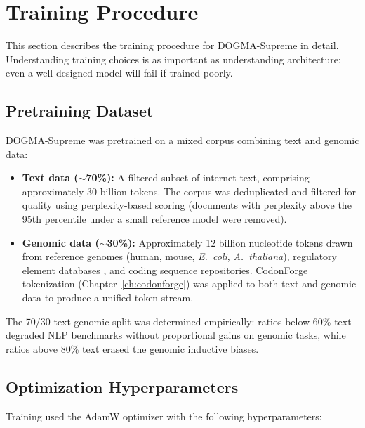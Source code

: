 \section{Training Procedure}
\label{sec:training}

This section describes the training procedure for DOGMA-Supreme in detail. Understanding training choices is as important as understanding architecture: even a well-designed model will fail if trained poorly.

\subsection{Pretraining Dataset}

DOGMA-Supreme was pretrained on a mixed corpus combining text and genomic data:

\begin{itemize}[leftmargin=1.8em]
  \item \textbf{Text data ($\sim$70\%):} A filtered subset of internet text, comprising approximately 30 billion tokens. The corpus was deduplicated and filtered for quality using perplexity-based scoring (documents with perplexity above the 95th percentile under a small reference model were removed).
  \item \textbf{Genomic data ($\sim$30\%):} Approximately 12 billion nucleotide tokens drawn from reference genomes (human, mouse, \textit{E.~coli}, \textit{A.~thaliana}), regulatory element databases \citep{encode2012}, and coding sequence repositories. CodonForge tokenization (Chapter~\ref{ch:codonforge}) was applied to both text and genomic data to produce a unified token stream.
\end{itemize}

The 70/30 text-genomic split was determined empirically: ratios below 60\% text degraded NLP benchmarks without proportional gains on genomic tasks, while ratios above 80\% text erased the genomic inductive biases.

\subsection{Optimization Hyperparameters}

Training used the AdamW optimizer \citep{kingma2015} with the following hyperparameters:

